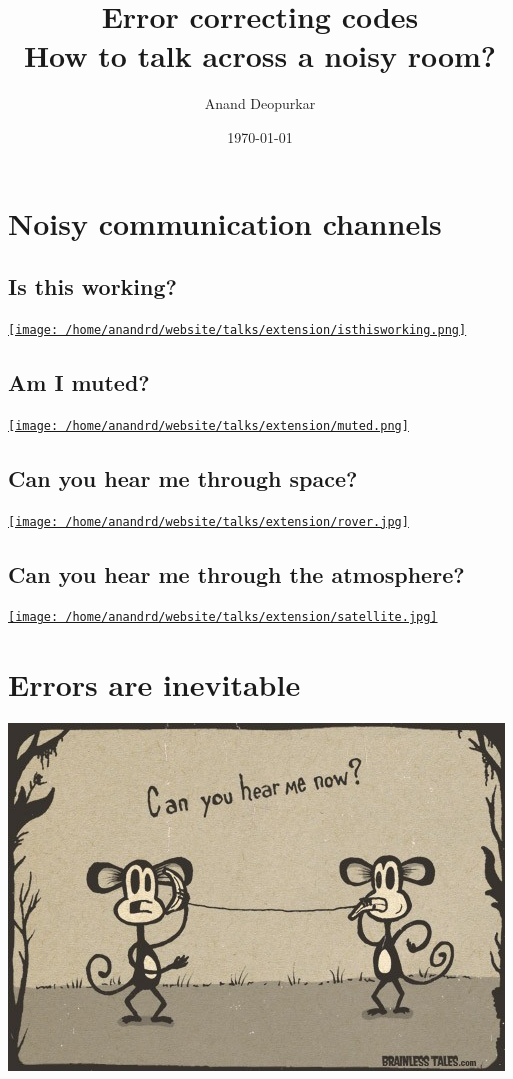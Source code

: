 \documentclass[11pt]{article}
\author{Anand Deopurkar}
\date{\today}
\title{Error correcting codes\\\medskip
\large How to talk across a noisy room?}
\begin{document}
\maketitle

\section*{Noisy communication channels}
\label{sec:org4007ad6}
\subsection*{Is this working?}
\label{sec:orge3f807d}
\href{isthisworking.png}{\texttt{[image: /home/anandrd/website/talks/extension/isthisworking.png]}}

\subsection*{Am I muted?}
\label{sec:orgf0aa5b1}
\href{muted.png}{\texttt{[image: /home/anandrd/website/talks/extension/muted.png]}}
\subsection*{Can you hear me through space?}
\label{sec:org442594b}
\href{rover.jpg}{\texttt{[image: /home/anandrd/website/talks/extension/rover.jpg]}}

\subsection*{Can you hear me through the atmosphere?}
\label{sec:orga92e08d}
\href{satellite.jpg}{\texttt{[image: /home/anandrd/website/talks/extension/satellite.jpg]}}

\section*{Errors are inevitable}
\label{sec:org6948626}
\begin{center}
\includegraphics[width=.9\linewidth]{canyouhearme.jpg}
\end{center}
\end{document}
